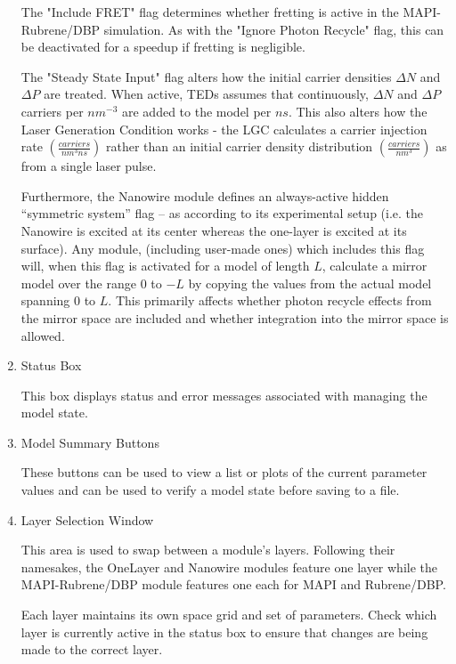 \documentclass[11pt,letterpaper,titlepage]{article}
\begin{document}
\begin{enumerate}
				\par The "Include FRET" flag determines whether fretting is active in the MAPI-Rubrene/DBP simulation. As with the "Ignore Photon Recycle" flag, this can be deactivated for a speedup if fretting is negligible.
				
				\par The "Steady State Input" flag alters how the initial carrier densities $\Delta N$ and $\Delta P$ are treated. When active, TEDs assumes that continuously, $\Delta N$ and $\Delta P$ carriers per $ nm^{-3}$ are added to the model per $ ns $. This also alters how the Laser Generation Condition works - the LGC calculates a carrier injection rate $ (\frac{carriers}{nm^{3} ns})$ rather than an initial carrier density distribution $(\frac{carriers}{nm^{3}})$ as from a single laser pulse.
				
				\par Furthermore, the Nanowire module defines an always-active hidden “symmetric system” flag – as according to its experimental setup (i.e. the Nanowire is excited at its center whereas the one-layer is excited at its surface). Any module, (including user-made ones) which includes this flag will, when this flag is activated for a model of length $L$, calculate a mirror model over the range 0 to $-L$ by copying the values from the actual model spanning 0 to $L$. This primarily affects whether photon recycle effects from the mirror space are included and whether integration into the mirror space is allowed.
				
				\item Status Box
				\par
				This box displays status and error messages associated with managing the model state.
				
				\item Model Summary Buttons
				\par These buttons can be used to view a list or plots of the current parameter values and can be used to verify a model state before saving to a file.
				
				\item Layer Selection Window
				\par This area is used to swap between a module's layers. Following their namesakes, the OneLayer and Nanowire modules feature one layer while the MAPI-Rubrene/DBP module features one each for MAPI and Rubrene/DBP.
				
				\par Each layer maintains its own space grid and set of parameters. Check which layer is currently active in the status box to ensure that changes are being made to the correct layer.
				

\end{enumerate}
\end{document}
